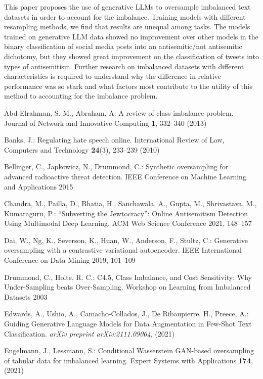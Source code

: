 \documentclass[runningheads]{llncs}
\begin{document}
This paper proposes the use of generative LLMs to oversample imbalanced text datasets in order to account for the imbalance. Training models with different resampling methods, we find that results are unequal among tasks. The models trained on generative LLM data showed no improvement over other models in the binary classification of social media posts into an antisemitic/not antisemitic dichotomy, but they showed great improvement on the classification of tweets into types of antisemitism. Further research on imbalanced datasets with different characteristics is required to understand why the difference in relative performance was so stark and what factors most contribute to the utility of this method to accounting for the imbalance problem.

\begin{thebibliography}{27}
Abd Elrahman, S. M., Abraham, A: A review of class imbalance problem. Journal of Network and Innovative Computing \textbf{1}, 332--340 (2013)

Banks, J.: Regulating hate speech online. International Review of Law, Computers and Technology \textbf{24}(3), 233--239 (2010)

Bellinger, C., Japkowicz, N., Drummond, C.: Synthetic oversampling for advanced radioactive threat detection. IEEE Conference on Machine Learning and Applications 2015

Chandra, M., Pailla, D., Bhatia, H., Sanchawala, A., Gupta, M., Shrivastava, M., Kumaraguru, P.: ``Subverting the Jewtocracy'': Online Antisemitism Detection Using Multimodal Deep Learning. ACM Web Science Conference 2021, 148--157

Dai, W., Ng, K., Severson, K., Huan, W., Anderson, F., Stultz, C.: Generative oversampling with a contrastive variational autoencoder. IEEE International Conference on Data Mining 2019, 101--109

Drummond, C., Holte, R. C.: C4.5, Class Imbalance, and Cost Sensitivity: Why Under-Sampling beats Over-Sampling. Workshop on Learning from Imbalanced Datasets 2003

Edwards, A., Ushio, A., Camacho-Collados, J., De Ribaupierre, H., Preece, A.: Guiding Generative Language Models for Data Augmentation in Few-Shot Text Classification. \emph{arXiv preprint arXiv:2111.09064}, (2021)

Engelmann, J., Lessmann, S.: Conditional Wasserstein GAN-based oversampling of tabular data for imbalanced learning. Expert Systems with Applications \textbf{174}, (2021)


\end{thebibliography}
\end{document}
